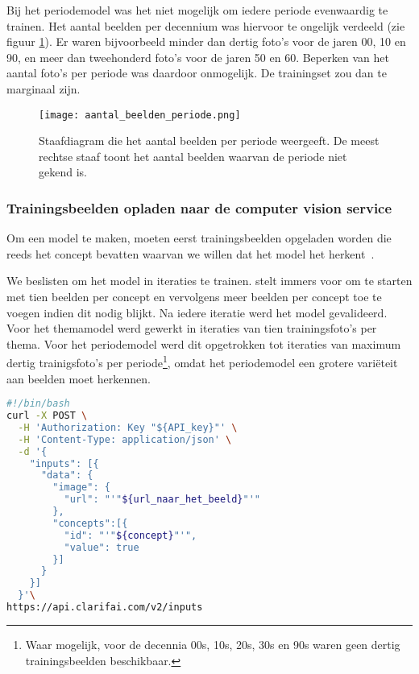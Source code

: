 Bij het periodemodel was het niet mogelijk om iedere periode evenwaardig te trainen. Het aantal beelden per decennium was hiervoor te ongelijk verdeeld (zie figuur \ref{fig:aantal-beelden-periode}). Er waren bijvoorbeeld minder dan dertig foto’s voor de jaren 00, 10 en 90, en meer dan tweehonderd foto’s voor de jaren 50 en 60. Beperken van het aantal foto’s per periode was daardoor onmogelijk. De trainingset zou dan  te marginaal zijn.

\begin{figure}
	\centering
	\texttt{[image: aantal\_beelden\_periode.png]}\hfill
	\caption[Staafdiagram met het aantal beelden per periode]{Staafdiagram die het aantal beelden per periode weergeeft. De meest rechtse staaf toont het aantal beelden waarvan de periode niet gekend is.}
	\label{fig:aantal-beelden-periode}
\end{figure}


\subsubsection{Trainingsbeelden opladen naar de computer vision service}
\label{subsubsec:trainingsbeelden-opladen}

Om een model te maken, moeten eerst trainingsbeelden opgeladen worden die reeds het concept bevatten waarvan we willen dat het model het herkent~\autocite{ClarifaiAPI}. 

We beslisten om het model in iteraties te trainen. \textcite{ClarifaiAPI} stelt immers voor om te starten met tien beelden per concept en vervolgens meer beelden per concept toe te voegen indien dit nodig blijkt. Na iedere iteratie werd het model gevalideerd. Voor het themamodel werd gewerkt in iteraties van tien trainingsfoto’s per thema. Voor het periodemodel werd dit opgetrokken tot iteraties van maximum dertig trainigsfoto’s per periode\footnote{Waar mogelijk, voor de decennia 00s, 10s, 20s, 30s en 90s waren geen dertig trainingsbeelden beschikbaar.}, omdat het periodemodel een grotere variëteit aan beelden moet herkennen.




\begin{lstlisting}[language=bash,caption=bash commando om een beeld met een concept naar Clarifai op te laden.]
#!/bin/bash
curl -X POST \
  -H 'Authorization: Key "${API_key}"' \
  -H 'Content-Type: application/json' \
  -d '{
    "inputs": [{
      "data": {
        "image": {
          "url": "'"${url_naar_het_beeld}"'"
        },
        "concepts":[{
          "id": "'"${concept}"'",
          "value": true
        }]
      }
    }]
  }'\
https://api.clarifai.com/v2/inputs
\end{lstlisting}

